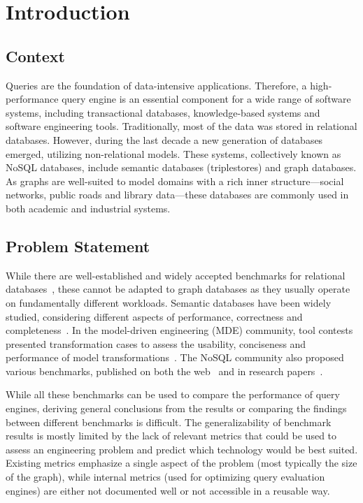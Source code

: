 \chapter{Introduction}

\section{Context}
Queries are the foundation of data-intensive applications. Therefore, a high-performance query engine is an essential component for a wide range of software systems, including transactional databases, knowledge-based systems and software engineering tools. Traditionally, most of the data was stored in relational databases. However, during the last decade a new generation of databases emerged, utilizing non-relational models. These systems, collectively known as NoSQL databases, include semantic databases (triplestores) and graph databases. As graphs are well-suited to model domains with a rich inner structure---\eg social networks, public roads and library data---these databases are commonly used in both academic and industrial systems.

\section{Problem Statement}
While there are well-established and widely accepted benchmarks for relational databases~\cite{tpc}, these cannot be adapted to graph databases as they usually operate on fundamentally different workloads. Semantic databases have been widely studied, considering different aspects of performance, correctness and completeness~\cite{sp2bench, berlin, dbpedia}. In the model-driven engineering (MDE) community, tool contests presented transformation cases to assess the usability, conciseness and performance of model transformations~\cite{ttc2015, ttc2014, ttc2013, ttc2011, ttc2010}. The NoSQL community also proposed various benchmarks, published on both the web~\cite{rodriguez_benchmark,dex_benchmark} and in research papers~\cite{DBLP:journals/ase/DayarathnaS14,McColl:2014:PEO:2567634.2567638}.

While all these benchmarks can be used to compare the performance of query engines, deriving general conclusions from the results or comparing the findings between different benchmarks is difficult. The generalizability of benchmark results is mostly limited by the lack of relevant metrics that could be used to assess an engineering problem and predict which technology would be best suited. Existing metrics emphasize a single aspect of the problem (most typically the size of the graph), while internal metrics (\eg used for optimizing query evaluation engines) are either not documented well or not accessible in a reusable way.

